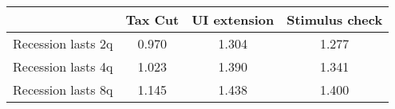 \begin{tabular}{@{}lccc@{}} 
\toprule 
& Tax Cut    & UI extension    & Stimulus check    \\  \midrule 
Recession lasts 2q &0.970  & 1.304  & 1.277     \\ 
Recession lasts 4q &1.023  & 1.390  & 1.341     \\ 
Recession lasts 8q &1.145  & 1.438  & 1.400     \\ 
\end{tabular}  
